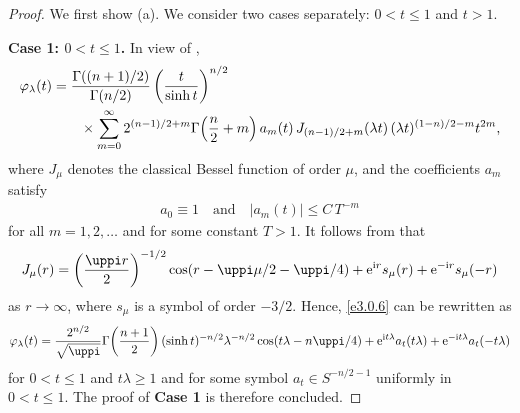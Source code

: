 \documentclass[a4paper,12pt]{amsart}
\numberwithin{equation}{section}
\theoremstyle{definition}
\theoremstyle{remark}
\numberwithin{theorem}{section}
\newcommand{\e}{\mathrm{e}}
\renewcommand{\i}{\mathrm{i}}
\begin{document}
\begin{proof}
We first show (a). We consider two cases separately: $0<t\leq 1$ and $t>1$.

\noindent\textbf{Case 1: $0<t\leq 1$.} In view of \cite[Theorem 2.1]{StTo},
\begin{align}
\varphi_\lambda(t)&={\Gamma((n+1)/2)\over \Gamma(n/2)}\left({t\over \sinh t}\right)^{n/2}\label{e3.0.6}\\
&\qquad \times\sum_{m=0}^\infty 2^{(n-1)/2+m}\Gamma\!\left({n\over 2}+m\right)a_m(t)\,J_{(n-1)/2+m}(\lambda t)\,(\lambda t)^{(1-n)/2-m}t^{2m},\notag
\end{align}
where $J_\mu$ denotes the classical Bessel function of order $\mu$, and the coefficients $a_m$ satisfy
\begin{align*}
a_0\equiv 1\quad \mbox{and}\quad |a_m(t)|\leq C\, T^{-m}
\end{align*}
for all $m=1,2,\dots$ and for some constant $T>1$. It follows from \cite[p. 356]{St} that
\begin{align*}
J_\mu(r)=\left(\uppi r\over 2\right)^{-1/2}\cos(r-\uppi\mu/2-\uppi/4)+\e^{\i r}s_\mu(r)+\e^{-\i r}s_\mu(-r)
\end{align*}
as $r\to\infty$, where $s_\mu$ is a symbol of order $-3/2$. Hence, \eqref{e3.0.6} can be rewritten as
\begin{align*}
\varphi_\lambda(t)={2^{n/2}\over \sqrt{\uppi}}\Gamma\!\left({n+1\over 2}\right) (\sinh t)^{-n/2} \lambda^{-n/2}\cos(t\lambda-n\uppi/4)+\e^{\i t\lambda}a_t(t\lambda)+\e^{-\i t\lambda}a_t(-t\lambda)
\end{align*}
for $0<t\leq 1$ and $t\lambda\geq 1$ and for some symbol $a_t\in S^{-n/2-1}$ uniformly in $0<t\leq 1$. The proof of \textbf{Case 1} is therefore concluded.


\end{proof}
\end{document}
